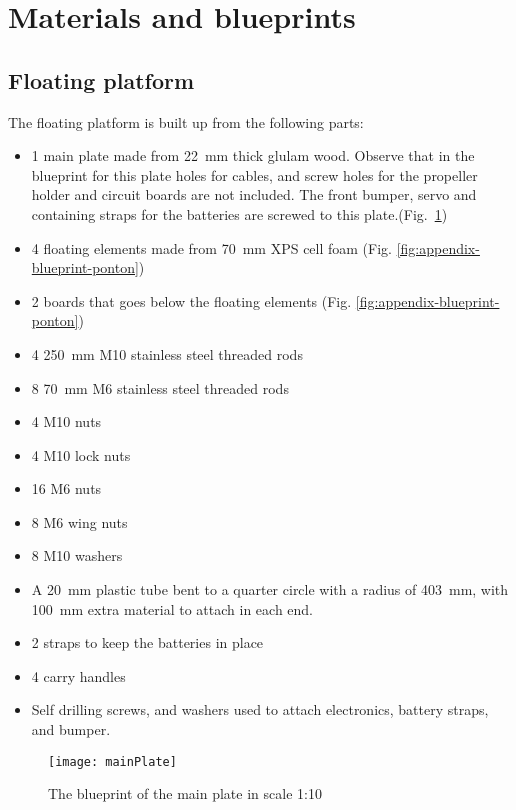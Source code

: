 \section{Materials and blueprints}\label{sec:appendix-a}

\subsection{Floating platform}

The floating platform is built up from the following parts:

\begin{itemize}
  \item 1 main plate made  from 22~mm thick glulam wood. Observe that in the
    blueprint for this plate holes for cables, and screw holes for the
    propeller holder and circuit boards are not included. The front bumper,
    servo and containing straps for the batteries are screwed to this plate.(Fig.~\ref{fig:appendix-blueprint-main-plate})
  \item 4 floating elements made from 70~mm XPS cell foam (Fig. \ref{fig:appendix-blueprint-ponton})
  \item 2 boards that goes below the floating elements (Fig. \ref{fig:appendix-blueprint-ponton})
  \item 4 250~mm M10 stainless steel threaded rods
  \item 8 70~mm M6 stainless steel threaded rods
  \item 4 M10 nuts
  \item 4 M10 lock nuts
  \item 16 M6 nuts
  \item 8 M6 wing nuts
  \item 8 M10 washers
  \item A 20~mm plastic tube bent to a quarter circle with a radius of 403~mm,
    with 100~mm extra material to attach in each end.
  \item 2 straps to keep the batteries in place
  \item 4 carry handles
  \item Self drilling screws, and washers used to attach electronics, battery
    straps, and bumper.
  \end{itemize}

  \begin{figure}
    \centering
    \texttt{[image: mainPlate]}

    \caption{The blueprint of the main plate in scale 1:10}
    \label{fig:appendix-blueprint-main-plate}
\end{figure}



